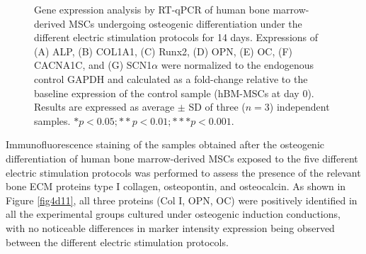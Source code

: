 \begin{figure}
\caption{Gene expression analysis by RT-qPCR of human bone marrow-derived \ac{MSCs} undergoing osteogenic differentiation under the different electric stimulation protocols for 14 days. Expressions of (A) ALP, (B) COL1A1, (C) Runx2, (D) OPN, (E) OC, (F) CACNA1C, and (G) SCN1$\alpha$ were normalized to the endogenous control GAPDH and calculated as a fold-change relative to the baseline expression of the control sample (hBM-MSCs at day 0). Results are expressed as average $\pm$ SD of three ($n=3$) independent samples. $*p < 0.05; **p < 0.01; ***p < 0.001$.}
\label{fig4d10}
\end{figure}

Immunofluorescence staining of the samples obtained after the osteogenic differentiation of human bone marrow-derived \ac{MSCs} exposed to the five different electric stimulation protocols was performed to assess the presence of the relevant bone \ac{ECM} proteins type I collagen, osteopontin, and osteocalcin. As shown in Figure \ref{fig4d11}, all three proteins (Col I, OPN, OC) were positively identified in all the experimental groups cultured under osteogenic induction conductions, with no noticeable differences in marker intensity expression being observed between the different electric stimulation protocols.

